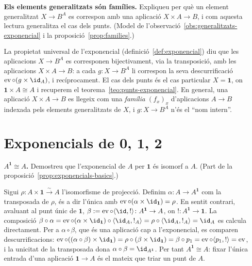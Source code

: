 \begin{exercici}
\textbf{Els elements generalitzats són famílies.} Expliqueu per què un element generalitzat \(X\to B^A\) es correspon amb una aplicació \(X\times A\to B\), i com aquesta lectura generalitza el cas dels punts. (Model de l'observació~\ref{obs:generalitzats-exponencial} i la proposició~\ref{prop:families}.)
\end{exercici}
\begin{solucio}
La propietat universal de l'exponencial (definició~\ref{def:exponencial}) diu que les aplicacions \(X\to B^A\) es corresponen bijectivament, via la transposició, amb les aplicacions \(X\times A\to B\): a cada \(g\colon X\to B^A\) li correspon la seva descurrificació \(\operatorname{ev}\circ(g\times\id_A)\), i recíprocament. El cas dels punts és el cas particular \(X=\mathbf1\), on \(\mathbf1\times A\cong A\) i recuperem el teorema~\ref{teo:punts-exponencial}. En general, una aplicació \(X\times A\to B\) es llegeix com una \emph{família} \((f_x)_x\) d'aplicacions \(A\to B\) indexada pels elements generalitzats de \(X\), i \(g\colon X\to B^A\) n'és el \enquote{nom intern}.
\end{solucio}

\section{Exponencials de \texorpdfstring{\(\mathbf0\), \(\mathbf1\), \(\mathbf2\)}{0, 1, 2}}\label{prac:exp-basics}

\begin{exercici}
\textbf{\(A^{\mathbf1}\cong A\).} Demostreu que l'exponencial de \(A\) per \(\mathbf1\) és isomorf a \(A\). (Part de la proposició~\ref{prop:exponencials-basics}.)
\end{exercici}
\begin{solucio}
Sigui \(\rho\colon A\times\mathbf1\xrightarrow{\sim}A\) l'isomorfisme de projecció. Definim \(\alpha\colon A\to A^{\mathbf1}\) com la transposada de \(\rho\), és a dir l'única amb \(\operatorname{ev}\circ(\alpha\times\id_{\mathbf1})=\rho\). En sentit contrari, avaluant al punt únic de \(\mathbf1\), \(\beta:=\operatorname{ev}\circ\langle\id,{!}\rangle\colon A^{\mathbf1}\to A\), on \({!}\colon A^{\mathbf1}\to\mathbf1\). La composició \(\beta\circ\alpha=\operatorname{ev}\circ(\alpha\times\id_{\mathbf1})\circ\langle\id_A,{!}_A\rangle=\rho\circ\langle\id_A,{!}_A\rangle=\id_A\) es calcula directament. Per a \(\alpha\circ\beta\), que és una aplicació cap a l'exponencial, es comparen descurrificacions: \(\operatorname{ev}\circ((\alpha\circ\beta)\times\id_{\mathbf1})=\rho\circ(\beta\times\id_{\mathbf1})=\beta\circ p_1=\operatorname{ev}\circ\langle p_1,{!}\rangle=\operatorname{ev}\), i la unicitat de la transposada dona \(\alpha\circ\beta=\id_{A^{\mathbf1}}\). Per tant \(A^{\mathbf1}\cong A\): fixar l'única entrada d'una aplicació \(\mathbf1\to A\) és el mateix que triar un punt de \(A\).
\end{solucio}

